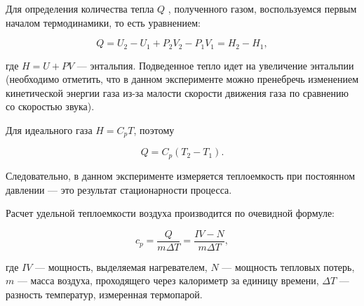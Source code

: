 \documentclass[a4paper,12pt]{article} %
\begin{document}
Для определения количества тепла $Q$ , полученного газом, воспользуемся первым началом термодинамики, то есть уравнением:

\begin{equation*}
	Q = U_{2} - U_{1} + P_{2}V_{2} - P_{1}V_{1} = H_{2} - H_{1},
\end{equation*}


\noindent где $H = U + PV$ — энтальпия. Подведенное тепло идет на увеличение энтальпии (необходимо отметить, что в данном эксперименте можно пренебречь изменением кинетической энергии газа из-за малости скорости движения газа по сравнению со скоростью звука).


Для идеального газа $H = C_{p}T$, поэтому


\begin{equation*}
	Q = C_{p}(T_{2} - T_{1}).
\end{equation*}


\noindent Следовательно, в данном эксперименте измеряется теплоемкость при постоянном давлении — это результат стационарности процесса.


Расчет удельной теплоемкости воздуха производится по очевидной формуле:


\begin{equation}
	c_{p} = \frac{Q}{m\Delta T} = \frac{IV - N}{m\Delta T},
\end{equation}


\noindent где $IV$ — мощность, выделяемая нагревателем, $N$ — мощность тепловых потерь, $m$ — масса воздуха, проходящего через калориметр за единицу времени, $\Delta T$ — разность температур, измеренная термопарой.
\end{document}
